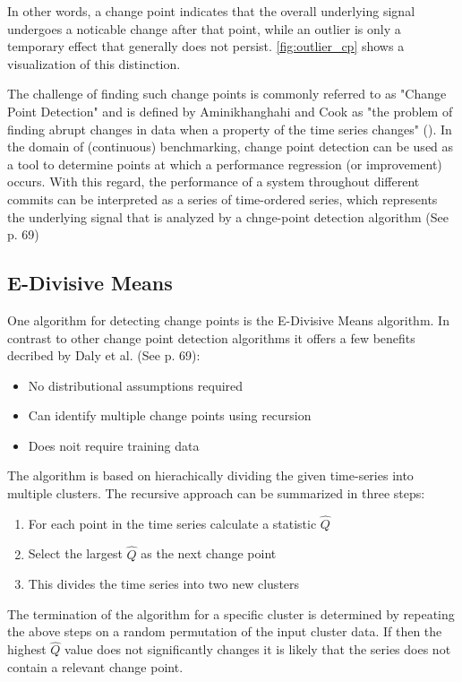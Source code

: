 \documentclass[	runningheads,
				a4paper]{llncs}
\begin{document}
	In other words, a change point indicates that the overall underlying signal undergoes a noticable change after that point, while an outlier is only a temporary effect that generally does not persist. \autoref{fig:outlier_cp} shows a visualization of this distinction.

	The challenge of finding such change points is commonly referred to as "Change Point Detection" and is defined by Aminikhanghahi and Cook as "the problem of finding abrupt changes in data when a property of the time series changes" (\cite{Samaneh2016}). In the domain of (continuous) benchmarking, change point detection can be used as a tool to determine points at which a performance regression (or improvement) occurs. With this regard, the performance of a system throughout different commits can be interpreted as a series of time-ordered series, which represents the underlying signal that is analyzed by a chnge-point detection algorithm (See \cite{daly2020} p. 69)

	\subsection{E-Divisive Means}
	\label{ssec:cp_edivisive}
	One algorithm for detecting change points is the E-Divisive Means algorithm. In contrast to other change point detection algorithms it offers a few benefits decribed by Daly et al. (See \cite{daly2020} p. 69):
	
	\begin{itemize}
		\item No distributional assumptions required
		\item Can identify multiple change points using recursion
		\item Does noit require training data
	\end{itemize}

	The algorithm is based on hierachically dividing the given time-series into multiple clusters. The recursive approach can be summarized in three steps:
	\begin{enumerate}
		\item For each point in the time series calculate a statistic $\hat{Q}$
		\item Select the largest $\hat{Q}$ as the next change point
		\item This divides the time series into two new clusters
	\end{enumerate}

	The termination of the algorithm for a specific cluster is determined by repeating the above steps on a random permutation of the input cluster data. If then the highest $\hat{Q}$ value does not significantly changes it is likely that the series does not contain a relevant change point.
\end{document}
